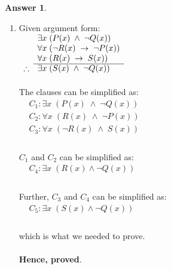 \documentclass[a4paper]{article}
\theoremstyle{definition}
\newtheorem{answer}{Answer}
\begin{document}
\vspace*{2em}
\begin{answer}\
    \begin{enumerate}
        \item Given argument form:\\
        $\begin{array}{rl}
                        & \exists x \; (P(x) \; \land \; \lnot Q(x)) \\
                        & \forall x \; (\lnot R(x) \; \rightarrow \; \lnot P(x)) \\
                        & \forall x \; (R(x) \; \rightarrow \; S(x)) \\
                        \cline{2-2}
            \therefore & \exists x \; (S(x) \; \land \; \lnot Q(x)) \\
                  \end{array}$\\\\
        The clauses can be simplified as:\\
        $\begin{array}{rl}
                        & C_1: \exists x \; (P(x) \; \land \; \lnot Q(x)) \\
                        & C_2: \forall x \; (R(x) \; \land \; \lnot P(x)) \\
                        & C_3: \forall x \; (\lnot R(x) \; \land \; S(x)) \\
                  \end{array}$\\\\
        $C_1$ and $C_2$ can be simplified as:\\
        $\begin{array}{rl}
                        &C_4: \exists x \; (R(x) \land \lnot Q(x)) \\
                  \end{array}$\\\\
        Further, $C_3$ and $C_4$ can be simplified as:\\
        $\begin{array}{rl}
                        &C_5: \exists x \; (S(x) \land \lnot Q(x)) \\
                  \end{array}$\\\\
                  which is what we needed to prove.\\\\
        \textbf{Hence, proved}.
        

\end{enumerate}
\end{answer}
\end{document}
